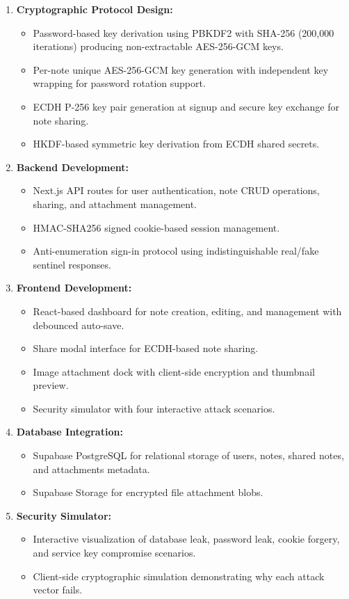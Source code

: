 \begin{enumerate}
    \item \textbf{Cryptographic Protocol Design:}
    \begin{itemize}
        \item Password-based key derivation using PBKDF2 with SHA-256 (200,000 iterations) producing non-extractable AES-256-GCM keys.
        \item Per-note unique AES-256-GCM key generation with independent key wrapping for password rotation support.
        \item ECDH P-256 key pair generation at signup and secure key exchange for note sharing.
        \item HKDF-based symmetric key derivation from ECDH shared secrets.
    \end{itemize}

    \item \textbf{Backend Development:}
    \begin{itemize}
        \item Next.js API routes for user authentication, note CRUD operations, sharing, and attachment management.
        \item HMAC-SHA256 signed cookie-based session management.
        \item Anti-enumeration sign-in protocol using indistinguishable real/fake sentinel responses.
    \end{itemize}

    \item \textbf{Frontend Development:}
    \begin{itemize}
        \item React-based dashboard for note creation, editing, and management with debounced auto-save.
        \item Share modal interface for ECDH-based note sharing.
        \item Image attachment dock with client-side encryption and thumbnail preview.
        \item Security simulator with four interactive attack scenarios.
    \end{itemize}

    \item \textbf{Database Integration:}
    \begin{itemize}
        \item Supabase PostgreSQL for relational storage of users, notes, shared notes, and attachments metadata.
        \item Supabase Storage for encrypted file attachment blobs.
    \end{itemize}

    \item \textbf{Security Simulator:}
    \begin{itemize}
        \item Interactive visualization of database leak, password leak, cookie forgery, and service key compromise scenarios.
        \item Client-side cryptographic simulation demonstrating why each attack vector fails.
    \end{itemize}
\end{enumerate}

